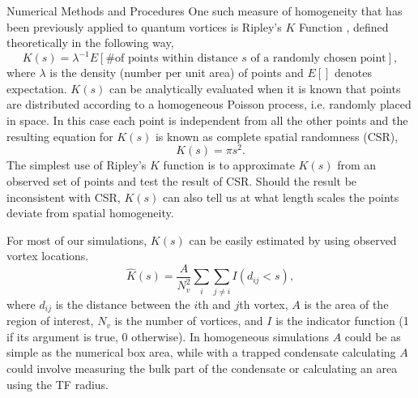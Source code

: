 \begin{chapter}{\label{cha:numerics}Numerical Methods and Procedures}
  One such measure of homogeneity that has been previously applied to quantum vortices \cite{bagg12} is Ripley's $K$ Function \cite{dixon_2002}, defined theoretically in the following way,
  \begin{equation}\label{eq:ripleysktheory}
    K(s) = \lambda^{-1}E[\text{\# of points within distance $s$ of a randomly chosen point}],
  \end{equation}
  where $\lambda$ is the density (number per unit area) of points and $E[]$ denotes expectation. $K(s)$ can be analytically evaluated when it is known that points are distributed according to a homogeneous Poisson process, i.e. randomly placed in space. In this case each point is independent from all the other points and the resulting equation for $K(s)$ is known as complete spatial randomness (CSR),
  \begin{equation}\label{eq:ripleyskcsr}
    K(s) = \pi s^2.
  \end{equation}
  The simplest use of Ripley's $K$ function is to approximate $K(s)$ from an observed set of points and test the result of CSR. Should the result be inconsistent with CSR, $K(s)$ can also tell us at what length scales the points deviate from spatial homogeneity.

  For most of our simulations, $K(s)$ can be easily estimated by using observed vortex locations.
  \begin{equation}\label{eq:ripleysk}
    \hat{K}(s) = \frac{A}{N_v^2}\sum\limits_{i}\sum\limits_{j \ne i} I\left (d_{ij}<s\right ),
  \end{equation}
  where $d_{ij}$ is the distance between the $i$th and $j$th vortex, $A$ is the area of the region of interest, $N_v$ is the number of vortices, and $I$ is the indicator function (1 if its argument is true, 0 otherwise). In homogeneous simulations $A$ could be as simple as the numerical box area, while with a trapped condensate calculating $A$ could involve measuring the bulk part of the condensate or calculating an area using the TF radius.


\end{chapter}
